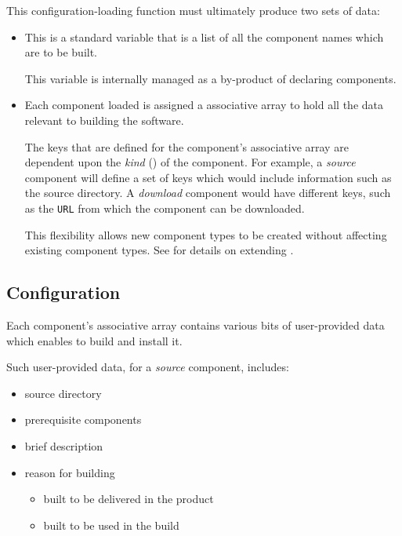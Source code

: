 This configuration-loading function must ultimately produce two sets
of data:

\begin{itemize}
\item \lmsbwcomponents

  This is a standard \gnumake variable that is a list of all the
  component names which are to be built.

  This variable is internally managed as a by-product of declaring
  components.

\item {}

  Each component loaded is assigned a \gmsl{} associative
  array to hold all the data relevant to building the software.

  The keys that are defined for the component's associative array are
  dependent upon the \emph{kind} () of the
  component.  For example, a \emph{source} component will define a set
  of keys which would include information such as the source
  directory.  A \emph{download} component would have different keys,
  such as the \texttt{URL} from which the component can be downloaded.

  This flexibility allows new component types to be created without
  affecting existing component types.  See  for
  details on extending \lmsbw.
\end{itemize}


\subsection{ Configuration}

Each component's associative array contains various bits of
user-provided data which enables \lmsbw to build and install it.

Such user-provided data, for a \emph{source} component, includes:

\begin{itemize}
\item source directory
\item prerequisite components
\item brief description
\item reason for building
  \begin{itemize}
  \item built to be delivered in the product
  \item built to be used in the build
  \end{itemize}
\end{itemize}

